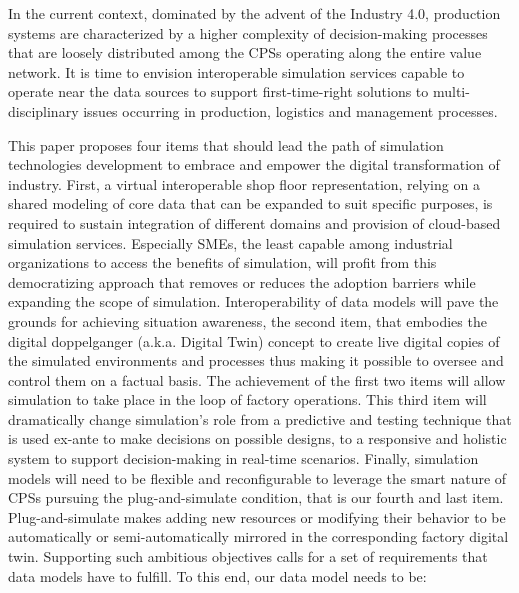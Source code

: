 In the current context, dominated by the advent of the Industry 4.0, production systems are characterized by a higher complexity of decision-making processes that are loosely distributed among the CPSs operating along the entire value network. 
It is time to envision interoperable simulation services capable to operate near the data sources to support first-time-right solutions to multi-disciplinary issues occurring in production, logistics and management processes.

This paper proposes four items that should lead the path of simulation technologies development to embrace and empower the digital transformation of industry. 
First, a virtual interoperable shop floor representation, relying on a shared modeling of core data that can be expanded to suit specific purposes, is required to sustain integration of different domains and provision of cloud-based simulation services. 
Especially SMEs, the least capable among industrial organizations to access the benefits of simulation, will profit from this democratizing approach that removes or reduces the adoption barriers while expanding the scope of simulation.
Interoperability of data models will pave the grounds for achieving situation awareness, the second item, that embodies the digital doppelganger (a.k.a. Digital Twin) concept to create live digital copies of the simulated environments and processes thus making it possible to oversee and control them on a factual basis.
The achievement of the first two items will allow simulation to take place in the loop of factory operations. This third item will dramatically change simulation's role from a predictive and testing technique that is used ex-ante to make decisions on possible designs, to a responsive and holistic system to support decision-making in real-time scenarios.
Finally, simulation models will need to be flexible and reconfigurable to leverage the smart nature of CPSs pursuing the plug-and-simulate condition, that is our fourth and last item. Plug-and-simulate makes adding new resources or modifying their behavior to be automatically or semi-automatically mirrored in the corresponding factory digital twin.
Supporting such ambitious objectives calls for a set of requirements that data models have to fulfill. To this end, our data model needs to be:
